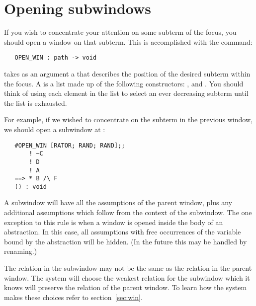 \section{Opening subwindows}
If you wish to concentrate your attention on some subterm of the focus,
you should open a window on that subterm.
This is accomplished with the command:
\begin{boxed}\begin{verbatim}
   OPEN_WIN : path -> void
\end{verbatim}\end{boxed}
 takes as an argument a  that describes the
position of the desired subterm within the focus.
A  is a list made up of the following
constructors: ,  and .
You should think of using each element in the list to select
an ever decreasing subterm until the list is exhausted.

For example, if we wished to concentrate on the subterm  in
the previous window, we should open a subwindow at :
\begin{session}\begin{verbatim}
   #OPEN_WIN [RATOR; RAND; RAND];;
       ! ~C
       ! D
       ! A
   ==> * B /\ F
   () : void
\end{verbatim}\end{session}

A subwindow will have all the assumptions of the parent window,
plus any additional assumptions which follow from the context of the subwindow.
The one exception to this rule is when a window is opened inside the body of an
abstraction.
In this case, all assumptions with free occurrences of the variable bound
by the abstraction will be hidden.
(In the future this may be handled by renaming.)

The relation in the subwindow may not be the same as the relation in the
parent window.   The system will choose the weakest relation for the
subwindow which it knows will preserve the relation of the parent window.
To learn how the system makes these choices refer to section~\ref{sec:win}.

